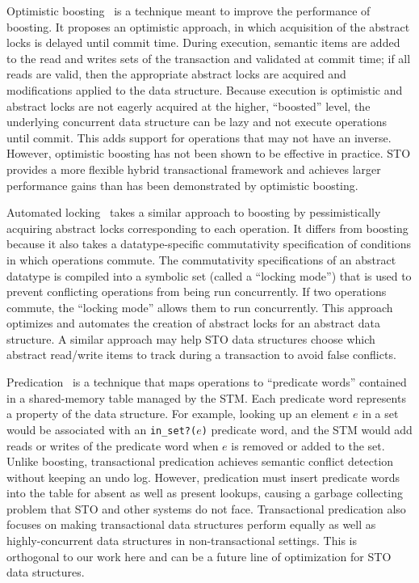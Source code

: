 Optimistic boosting~\cite{optboost} is a technique meant to improve the performance of boosting. It proposes an optimistic approach, in which acquisition of the abstract locks is delayed until commit time. During execution, semantic items are added to the read and writes sets of the transaction and validated at commit time; if all reads are valid, then the appropriate abstract locks are acquired and modifications applied to the data structure. Because execution is optimistic and abstract locks are not eagerly acquired at the higher, ``boosted'' level, the underlying concurrent data structure can be lazy and not execute operations until commit. This adds support for operations that may not have an inverse. 
However, optimistic boosting has not been shown to be effective in practice. STO provides a more flexible hybrid transactional framework and achieves larger performance gains than has been demonstrated by optimistic boosting.

Automated locking~\cite{autolock} takes a similar approach to boosting by pessimistically acquiring abstract locks corresponding to each operation. It differs from boosting because it also takes a datatype-specific commutativity specification of conditions in which operations commute. The commutativity specifications of an abstract datatype is compiled into a symbolic set (called a ``locking mode'') that is used to prevent conflicting operations from being run concurrently. If two operations commute, the ``locking mode'' allows them to run concurrently.
This approach optimizes and automates the creation of abstract locks for an abstract data structure. A similar approach may help STO data structures choose which abstract read/write items to track during a transaction to avoid false conflicts.

Predication~\cite{predication} is a technique that maps operations to ``predicate words'' contained in a shared-memory table managed by the STM. Each predicate word represents a property of the data structure. For example, looking up an element $e$ in a set would be associated with an \texttt{in\_set?($e$)} predicate word, and the STM would add reads or writes of the predicate word when $e$ is removed or added to the set. 
Unlike boosting, transactional predication achieves semantic conflict detection without keeping an undo log. However, predication must insert predicate words into the table for absent as well as present lookups, causing a garbage collecting problem that STO and other systems do not face. Transactional predication also focuses on making transactional data structures perform equally as well as highly-concurrent data structures in non-transactional settings. This is orthogonal to our work here and can be a future line of optimization for STO data structures.

